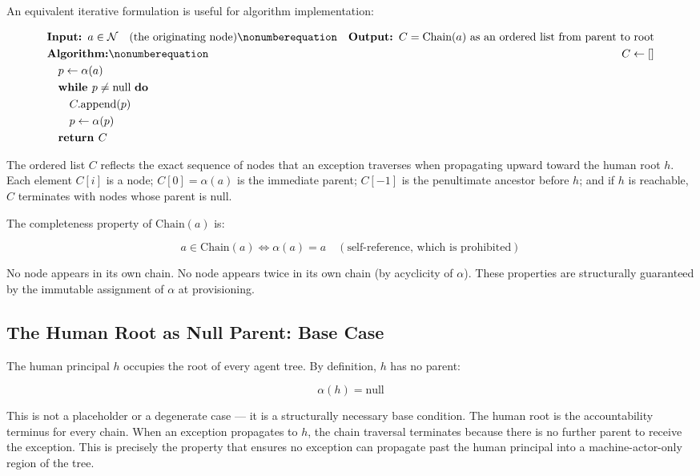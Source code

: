 An equivalent iterative formulation is useful for algorithm implementation:

\begin{align}
&\textbf{Input: } a \in \mathcal{N} \quad (\text{the originating node}) \nonumberequation
&\textbf{Output: } C = \text{Chain}(a) \text{ as an ordered list from parent to root} \\
&\textbf{Algorithm:} \nonumberequation
&\quad C \leftarrow [] \\
&\quad p \leftarrow \alpha(a) \\
&\quad \textbf{while } p \neq \text{null } \textbf{do} \\
&\qquad C.\text{append}(p) \\
&\qquad p \leftarrow \alpha(p) \\
&\quad \textbf{return } C
\end{align}

The ordered list $C$ reflects the exact sequence of nodes that an exception traverses when propagating upward toward the human root $h$. Each element $C[i]$ is a node; $C[0] = \alpha(a)$ is the immediate parent; $C[-1]$ is the penultimate ancestor before $h$; and if $h$ is reachable, $C$ terminates with nodes whose parent is null.

The completeness property of $\text{Chain}(a)$ is:

\begin{equation}
a \in \text{Chain}(a) \iff \alpha(a) = a \quad (\text{self-reference, which is prohibited})
\tag{CH-3}
\end{equation}

No node appears in its own chain. No node appears twice in its own chain (by acyclicity of $\alpha$). These properties are structurally guaranteed by the immutable assignment of $\alpha$ at provisioning.

\subsection{The Human Root as Null Parent: Base Case}

The human principal $h$ occupies the root of every \bxthree{} agent tree. By definition, $h$ has no parent:

\begin{equation}
\alpha(h) = \text{null}
\tag{HR-1}
\end{equation}

This is not a placeholder or a degenerate case — it is a structurally necessary base condition. The human root is the accountability terminus for every chain. When an exception propagates to $h$, the chain traversal terminates because there is no further parent to receive the exception. This is precisely the property that ensures no exception can propagate past the human principal into a machine-actor-only region of the tree.

